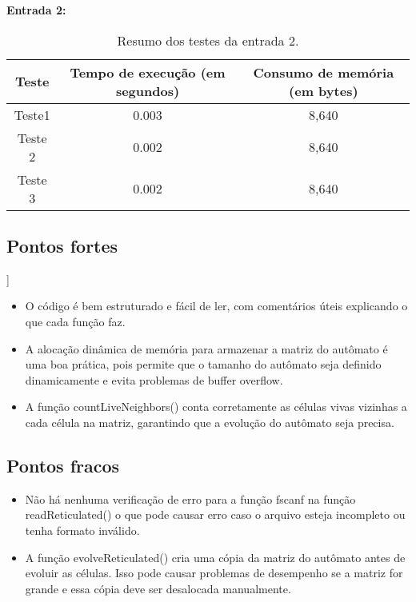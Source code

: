 \documentclass{article}
\begin{document}
\noindent \textbf{Entrada 2:}
\begin{table}[!htb]
    \centering
    \begin{tabular}{|c | c | c |}
        \hline
        Teste & Tempo de execução (em segundos) & Consumo de memória (em bytes) \\\hline
        Teste1 & 0.003 & 8,640  \\\hline
        Teste 2 & 0.002 & 8,640 \\\hline
        Teste 3 & 0.002 & 8,640 \\\hline
    \end{tabular}
    \caption{\label{tab:widgets}Resumo dos testes da entrada 2.}
\end{table}

\subsection{Pontos fortes}
\DESCRICAO{}]

\begin{itemize}
\item O código é bem estruturado e fácil de ler, com comentários úteis explicando o que cada função faz.
\item A alocação dinâmica de memória para armazenar a matriz do autômato é uma boa prática, pois permite que o tamanho do autômato seja definido dinamicamente e evita problemas de buffer overflow.
\item A função countLiveNeighbors() conta corretamente as células vivas vizinhas a cada célula na matriz, garantindo que a evolução do autômato seja precisa.
\end{itemize}

\subsection{Pontos fracos}
\DESCRICAO{}

\begin{itemize}
\item Não há nenhuma verificação de erro para a função fscanf na função readReticulated() o que pode causar erro caso o arquivo esteja incompleto ou tenha formato inválido.
\item A função evolveReticulated() cria uma cópia da matriz do autômato antes de evoluir as células. Isso pode causar problemas de desempenho se a matriz for grande e essa cópia deve ser desalocada manualmente.
\end{itemize}
\end{document}

